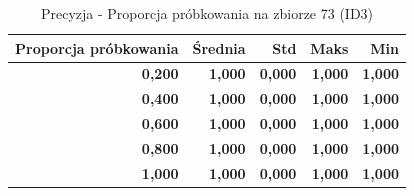 \begin{table}[htbp]
\centering
\small
\setlength{\tabcolsep}{6pt}
\renewcommand{\arraystretch}{1.2}
\caption{Precyzja - Proporcja próbkowania na zbiorze 73 (ID3)}
\label{tab:ID3_sample_ratio_73_precision}
\begin{tabular}{r|r|r|r|r}
\toprule
Proporcja próbkowania & Średnia & Std & Maks & Min \\
\hline
\textbf{0,200} & \textbf{1,000} & \textbf{0,000} & \textbf{1,000} & \textbf{1,000} \\
\textbf{0,400} & \textbf{1,000} & \textbf{0,000} & \textbf{1,000} & \textbf{1,000} \\
\textbf{0,600} & \textbf{1,000} & \textbf{0,000} & \textbf{1,000} & \textbf{1,000} \\
\textbf{0,800} & \textbf{1,000} & \textbf{0,000} & \textbf{1,000} & \textbf{1,000} \\
\textbf{1,000} & \textbf{1,000} & \textbf{0,000} & \textbf{1,000} & \textbf{1,000} \\
\bottomrule
\end{tabular}
\end{table}